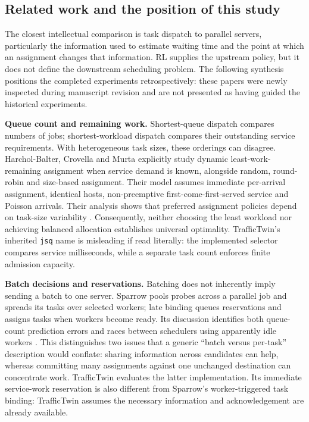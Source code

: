 \documentclass[11pt,a4paper]{article}
\begin{document}
\subsection{Related work and the position of this study}\label{sec:1.2}

The closest intellectual comparison is task dispatch to parallel servers, particularly the information used to estimate waiting time and the point at which an assignment changes that information. RL supplies the upstream policy, but it does not define the downstream scheduling problem. The following synthesis positions the completed experiments retrospectively: these papers were newly inspected during manuscript revision and are not presented as having guided the historical experiments.

\textbf{Queue count and remaining work.} Shortest-queue dispatch compares numbers of jobs; shortest-workload dispatch compares their outstanding service requirements. With heterogeneous task sizes, these orderings can disagree. Harchol-Balter, Crovella and Murta explicitly study dynamic least-work-remaining assignment when service demand is known, alongside random, round-robin and size-based assignment. Their model assumes immediate per-arrival assignment, identical hosts, non-preemptive first-come-first-served service and Poisson arrivals. Their analysis shows that preferred assignment policies depend on task-size variability \cite{ref2}. Consequently, neither choosing the least workload nor achieving balanced allocation establishes universal optimality. TrafficTwin's inherited \texttt{jsq} name is misleading if read literally: the implemented selector compares service milliseconds, while a separate task count enforces finite admission capacity.

\textbf{Batch decisions and reservations.} Batching does not inherently imply sending a batch to one server. Sparrow pools probes across a parallel job and spreads its tasks over selected workers; late binding queues reservations and assigns tasks when workers become ready. Its discussion identifies both queue-count prediction errors and races between schedulers using apparently idle workers \cite{ref9}. This distinguishes two issues that a generic ``batch versus per-task'' description would conflate: sharing information across candidates can help, whereas committing many assignments against one unchanged destination can concentrate work. TrafficTwin evaluates the latter implementation. Its immediate service-work reservation is also different from Sparrow's worker-triggered task binding: TrafficTwin assumes the necessary information and acknowledgement are already available.
\end{document}
